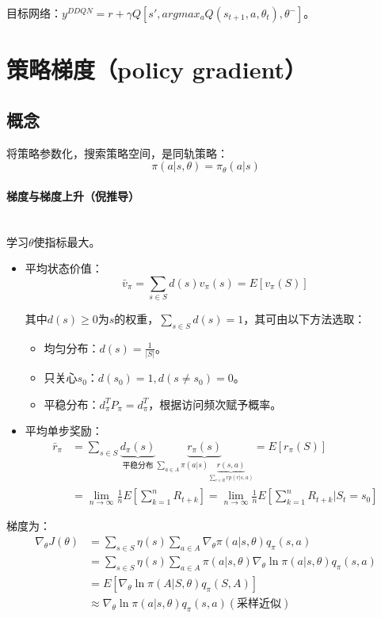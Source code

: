 \documentclass[
12pt, %
a4paper, 
oneside, %
headinclude,footinclude, %
]{scrartcl}
\begin{document}
目标网络：$ y^{DDQN} = r + \gamma Q[s', argmax_a Q(s_{t + 1}, a, \theta_t), \theta^-] $。
\section[策略梯度]{策略梯度（policy gradient）}
\subsection[概念]{概念}
将策略参数化，搜索策略空间，是同轨策略：
$$ \pi(a|s, \theta) = \pi_{\theta}(a|s) $$
\paragraph{梯度与梯度上升（倪推导）}~\\

学习$ \theta $使指标最大。
\begin{itemize}
\item 平均状态价值：
$$ \bar{v}_\pi = \sum_{s \in S} d(s) v_\pi(s) = E[v_\pi(S)] $$

其中$ d(s) \geq 0 $为$ s $的权重，$ \sum_{s \in S} d(s) = 1 $，其可由以下方法选取：
\begin{itemize}
\item 均匀分布：$ d(s) = \frac{1}{|S|} $。
\item 只关心$ s_0 $：$ d(s_0) = 1, d(s \neq s_0) = 0 $。
\item 平稳分布：$ d_{\pi}^T P_{\pi} = d_{\pi}^T $，根据访问频次赋予概率。
\end{itemize}
\item 平均单步奖励：
\begin{align*}
\bar{r}_\pi &= \sum_{s \in S} \underbrace{d_{\pi}(s)}_{\text{平稳分布}} \underbrace{r_\pi(s)}_{\sum_{a \in A} \pi(a|s)\underbrace{r(s, a)}_{\sum_{r \in R} r p(r|s, a)}} = E[r_\pi(S)] \\
&= \lim_{n \to \infty} \frac{1}{n}E[\sum_{k = 1}^{n} R_{t + k}] = \lim_{n \to \infty} \frac{1}{n}E[\sum_{k = 1}^{n} R_{t + k}|S_t = s_0]
\end{align*}
\end{itemize}

梯度为：
\begin{align*}
\nabla_\theta J(\theta) &= \sum_{s \in S} \eta(s) \sum_{a \in A} \nabla_\theta \pi(a|s, \theta) q_\pi(s, a) \\
&= \sum_{s \in S} \eta(s) \sum_{a \in A} \pi(a|s, \theta) \nabla_\theta \ln \pi(a|s, \theta) q_\pi(s, a) \\
&= E[\nabla_\theta \ln \pi(A|S, \theta) q_\pi(S, A)] \\
&\approx \nabla_\theta \ln \pi(a|s, \theta) q_\pi(s, a) (\text{采样近似})
\end{align*}
\end{document}

